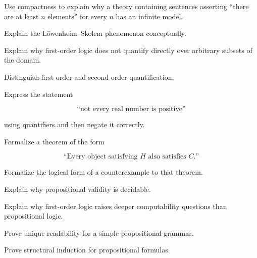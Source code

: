 \begin{exercise}[3]
Use compactness to explain why a theory containing sentences asserting
``there are at least \(n\) elements'' for every \(n\) has an infinite
model.
\end{exercise}

\begin{exercise}[3]
Explain the Löwenheim--Skolem phenomenon conceptually.
\end{exercise}

\begin{exercise}[3]
Explain why first-order logic does not quantify directly over arbitrary
subsets of the domain.
\end{exercise}

\begin{exercise}[3]
Distinguish first-order and second-order quantification.
\end{exercise}

\begin{exercise}[3]
Express the statement

\[
\text{``not every real number is positive''}
\]

using quantifiers and then negate it correctly.
\end{exercise}

\begin{exercise}[3]
Formalize a theorem of the form

\[
\text{``Every object satisfying \(H\) also satisfies \(C\).''}
\]
\end{exercise}

\begin{exercise}[3]
Formalize the logical form of a counterexample to that theorem.
\end{exercise}

\begin{exercise}[3]
Explain why propositional validity is decidable.
\end{exercise}

\begin{exercise}[3]
Explain why first-order logic raises deeper computability questions than
propositional logic.
\end{exercise}

\begin{exercise}[4]
Prove unique readability for a simple propositional grammar.
\end{exercise}

\begin{exercise}[4]
Prove structural induction for propositional formulas.
\end{exercise}

